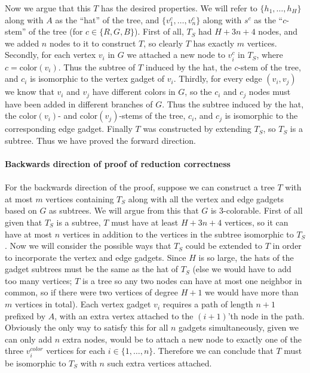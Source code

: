 Now we argue that this $T$ has the desired properties.
We will refer to $\{h_1,\ldots,h_H\}$ along with $A$
as the ``hat'' of the tree, and $\{v_1^c,\ldots,v_n^c\}$ along
with $s^c$ as the ``$c$-stem'' of the tree (for $c \in \{R, G, B\}$).
First of all, $T_S$ had $H + 3n + 4$ nodes, and we 
added $n$ nodes to it to construct $T$, so clearly $T$
has exactly $m$ vertices.
Secondly, for each vertex $v_i$ in $G$ we attached a new node to
$v_i^c$ in $T_S$, where $c = \text{color}(v_i)$.
Thus the subtree of $T$ induced by the hat, the $c$-stem
of the tree, and $c_i$ is isomorphic to the vertex gadget
of $v_i$. Thirdly, for every edge $(v_i, v_j)$ we know
that $v_i$ and $v_j$ have different colors in $G$, so
the $c_i$ and $c_j$ nodes must have been added in different
branches of $G$. Thus the subtree induced by the hat,
the $\text{color}(v_i)$- and $\text{color}(v_j)$-stems of the
tree, $c_i$, and $c_j$ is isomorphic to the corresponding
edge gadget. Finally $T$ was constructed by extending $T_S$,
so $T_S$ is a subtree. Thus we have proved the forward
direction.\\
\\
{\bf Backwards direction of proof of reduction correctness}\\
\\
For the backwards direction of the proof, suppose we can
construct a tree $T$ with at most $m$ vertices containing
$T_S$ along with all the vertex and edge gadgets based on
$G$ as subtrees. We will argue from this that $G$ is 3-colorable.
First of all given that $T_S$ is a subtree, $T$ must have at least
$H + 3n + 4$ vertices, so it can have at most $n$ vertices
in addition to the vertices in the subtree isomorphic to $T_S$.
Now we will consider the possible ways that $T_S$ could be
extended to $T$ in order to incorporate the vertex and
edge gadgets. Since $H$ is so large, the hats of the gadget
subtrees must be the same as the hat of $T_S$ (else we would
have to add too many vertices; $T$ is a tree so any two nodes
can have at most one neighbor in common, so if there
were two vertices of degree $H + 1$ we would have more
than $m$ vertices in total).
Each vertex gadget $v_i$ requires
a path of length $n + 1$ prefixed by $A$, with an extra vertex
attached to the $(i+1)$'th node in the path. Obviously the
only way to satisfy this for all $n$ gadgets simultaneously,
given we can only add $n$ extra nodes,
would be to attach a new node to exactly one
of the three $v_i^{color}$ vertices for each
$i \in \{1,\ldots,n\}$. Therefore we can conclude that $T$
must be isomorphic to $T_S$ with $n$ such extra vertices attached.

